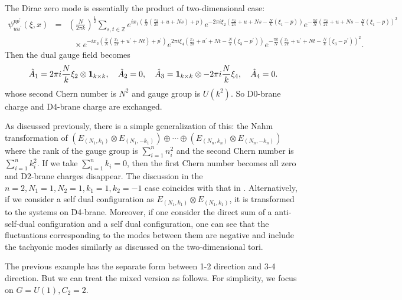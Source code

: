 \documentclass[a4paper,epsf,12pt]{article}
\newcommand{\Z}{{\mathbb{Z}}}
\newcommand{\unl}{\underline}
\newcommand{\fr}{\frac}
\newcommand{\half}{\frac{1}{2}}
\def \half{\frac{1}{2}}
\def \1{{\bf 1}}
\begin{document}
The Dirac zero mode is essentially the product of two-dimensional case:
\begin{eqnarray}
\label{zero_torus2}
\psi_{uu^\prime}^{pp^\prime}(\xi,x)
&=&\left(\frac{N}{2\pi k}\right)^{\half}
\sum_{s,t\in \Z} e^{ix_1(\frac{k}{N}(\frac{x_2}{2\pi}+u+Ns)+p)}
e^{-2\pi i\xi_2 (\fr{x_2}{2\pi}+u+Ns-\frac{N}{k}(\xi_1-p))}
e^{-\frac{\pi k}{N}(\frac{x_2}{2\pi}+u+Ns-\fr{N}{k}(\xi_1-p))^2}\nonumber\\
&&~~~\times e^{-ix_3(\frac{k}{N}(\frac{x_4}{2\pi}+u^\prime+Nt)+p^\prime)}
e^{2\pi i\xi_4
(\fr{x_4}{2\pi}+u^\prime+Nt-\frac{N}{k}(\xi_3-p^\prime))}
e^{-\frac{\pi k}{N}(\frac{x_4}{2\pi}+u^\prime+Nt-\fr{N}{k}(\xi_3-p^\prime))^2}.
\end{eqnarray}
Then the dual gauge field becomes
\begin{eqnarray*}
\hat{A}_1=2\pi i\frac{N}{k}\xi_2\otimes\1_{k\times k},~~~\hat{A}_2=0,~~~
\hat{A}_3=\1_{k\times k}\otimes-2\pi i\frac{N}{k}\xi_4,~~~\hat{A}_4=0.
\end{eqnarray*}
whose second Chern number is $N^2$ and gauge group is $U(k^2)$.
So D0-brane charge and D4-brane charge are exchanged.  

\vspace{2mm}

As discussed previously, there is a simple generalization of this:
the Nahm transformation 
of $(E_{(N_1,k_1)}\otimes E_{(N_1,-k_1)})\oplus \cdots \oplus 
(E_{(N_n,k_n)}\otimes E_{(N_n,-k_n)})$
where the rank of the gauge group is $\sum_{i=1}^{n}n^2_i$
and the second Chern number is $\sum_{i=1}^{n}k^2_i$.
If we take $\sum_{i=1}^n k_i=0$, then 
the first Chern number becomes all zero and
D2-brane charges disappear. 
The discussion in the  $n=2, N_1=1, N_2=1, k_1=1, k_2=-1$ case
coincides with that in \cite{vanBaal3}.
Alternatively, if we consider a self dual configuration as 
$E_{(N_1,k_1)}\otimes E_{(N_1,k_1)}$, 
it is transformed to the systems on \=D4-brane. 
Moreover, if one consider the direct sum of a 
anti-self-dual configuration and a self dual configuration, 
one can see that the fluctuations corresponding to the modes between them 
are negative and include the tachyonic modes 
similarly as discussed on the two-dimensional tori.  



\vspace{2mm}

The previous example has the separate form between
1-2 direction and 3-4 direction.
But we can treat the mixed version as follows.
For simplicity, we focus on $G=U(1), C_2=2$.
\end{document}
